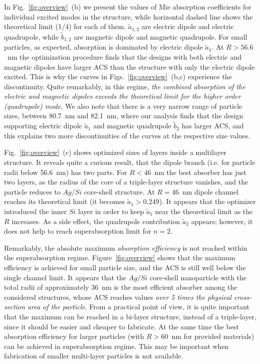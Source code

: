 \documentclass[twoside,twocolumn,9pt]{article}
\begin{document}
In Fig.~\ref{fig:overview}~(b) we present the values of Mie absorption
coefficients for individual excited modes in the structure, while
horizontal dashed line shows the theoretical limit (1/4) for each of
them. $\tilde{a}_{1,2}$ are electric dipole and electric quadrupole,
while $\tilde{b}_{1,2}$ are magnetic dipole and magnetic
quadrupole. For small particles, as expected, absorption is dominated
by electric dipole $\tilde{a}_1$.  At $R > 56.6$~nm the optimization
procedure finds that the designs with both electric and magnetic
dipoles have larger ACS than the structure with only the electric
dipole excited. This is why the curves in
Figs.~\ref{fig:overview}~(b,c) experience the discontinuity. Quite
remarkably, in this regime, {\em the combined absorption of the
  electric and magnetic dipoles exceeds the theoretical limit for the
  higher order (quadrupole) mode.}  We also note that there is a very
narrow range of particle sizes, between 80.7~nm and 82.1~nm, where our
analysis finds that the design supporting electric dipole
$\tilde{a}_1$ and magnetic quadrupole $\tilde{b}_2$ has larger ACS,
and this explains two more discontinuities of the curves at the
respective size values.

Fig.~\ref{fig:overview}~(c) shows optimized sizes of layers inside a
multilayer structure. It reveals quite a curious result, that the
dipole branch (i.e. for particle radii below 56.6~nm) has two
parts. For $R<46$~nm the best absorber has just two layers, as the
radius of the core of a triple-layer structure vanishes, and the
particle reduces to $Ag/Si$ core-shell structure.  At $R=46$~nm dipole
channel reaches its theoretical limit (it becomes
$\tilde{a}_1>0.249$).  It appears that the optimizer introduced the
inner $Si$ layer in order to keep $\tilde{a}_1$ near the theoretical
limit as the $R$ increases.  As a side effect, the quadrupole
contribution $\tilde{a}_2$ appears; however, it does not help to reach
superabsorption limit for $n=2$.

Remarkably, the absolute maximum {\em absorption efficiency} is not
reached within the superabsorption regime. Figure~\ref{fig:overview}
shows that the maximum efficiency is achieved for small particle size,
and the ACS is still well below the single channel limit. It appears
that the $Ag/Si$ core-shell nanoparticle with the total radii of
approximately 36~nm is the most efficient absorber among the
considered structures, whose ACS reaches values {\em over 5 times the
  physical cross-section area of the particle}.  From a practical
point of view, it is quite important that the maximum can be reached
in a bi-layer structure, instead of a triple-layer, since it should be
easier and cheaper to fabricate.  At the same time the best absorption
efficiency for larger particles (with $R>60$~nm for provided
materials) can be achieved in superabsorption regime. This may be
important when fabrication of smaller multi-layer particles is not
available.
\end{document}
